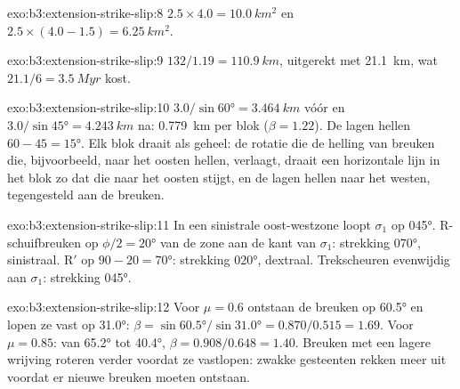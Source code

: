 \begin{solution}{exo:b3:extension-strike-slip:8}
$2.5\times4.0 = \qty{10.0}{km^2}$ en $2.5\times(4.0 - 1.5) =
\qty{6.25}{km^2}$.
\end{solution}

\begin{solution}{exo:b3:extension-strike-slip:9}
$132/1.19 = \qty{110.9}{km}$, uitgerekt met \qty{21.1}{km}, wat
$21.1/6 = \qty{3.5}{Myr}$ kost.
\end{solution}

\begin{solution}{exo:b3:extension-strike-slip:10}
$3.0/\sin\ang{60} = \qty{3.464}{km}$ vóór en $3.0/\sin\ang{45} =
\qty{4.243}{km}$ na: \qty{0.779}{km} per blok ($\beta = 1.22$). De lagen
hellen $60 - 45 = \ang{15}$. Elk blok draait als geheel: de rotatie die
de helling van breuken die, bijvoorbeeld, naar het oosten hellen, verlaagt, draait een horizontale lijn in het
blok zo dat die naar het oosten stijgt, en de lagen hellen naar het westen, tegengesteld aan de
breuken.
\end{solution}

\begin{solution}{exo:b3:extension-strike-slip:11}
In een sinistrale oost-westzone loopt $\sigma_1$ op \ang{045}. R-schuifbreuken op
$\phi/2 = \ang{20}$ van de zone aan de kant van $\sigma_1$: strekking \ang{070},
sinistraal. R$'$ op $90 - 20 = \ang{70}$: strekking \ang{020}, dextraal. Trekscheuren
evenwijdig aan $\sigma_1$: strekking \ang{045}.
\end{solution}

\begin{solution}{exo:b3:extension-strike-slip:12}
Voor $\mu = 0.6$ ontstaan de breuken op \ang{60.5} en lopen ze vast op \ang{31.0}: $\beta =
\sin\ang{60.5}/\sin\ang{31.0} = 0.870/0.515 = 1.69$. Voor $\mu = 0.85$: van
\ang{65.2} tot \ang{40.4}, $\beta = 0.908/0.648 = 1.40$. Breuken met een lagere
wrijving roteren verder voordat ze vastlopen: zwakke gesteenten rekken meer uit voordat
er nieuwe breuken moeten ontstaan.
\end{solution}

